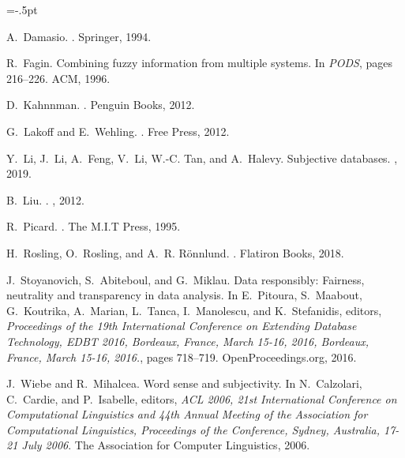 \documentclass[11pt]{article}
\begin{document}
\vspace{-.1cm}

\begin{thebibliography}{10}
\begin{small}



\itemsep=-.5pt

A.~Damasio.
.
\newblock Springer, 1994.

R.~Fagin.
\newblock Combining fuzzy information from multiple systems.
\newblock In {\em PODS}, pages 216--226. ACM, 1996.

D.~Kahnnman.
.
\newblock Penguin Books, 2012.

G.~Lakoff and E.~Wehling.
.
\newblock Free Press, 2012.

Y.~Li, J.~Li, A.~Feng, V.~Li, W.-C. Tan, and A.~Halevy.
\newblock Subjective databases.
, 2019.

B.~Liu.
.
, 2012.

R.~Picard.
.
\newblock The M.I.T Press, 1995.

H.~Rosling, O.~Rosling, and A.~R. Rönnlund.
.
\newblock Flatiron Books, 2018.

J.~Stoyanovich, S.~Abiteboul, and G.~Miklau.
\newblock Data responsibly: Fairness, neutrality and transparency in data
  analysis.
\newblock In E.~Pitoura, S.~Maabout, G.~Koutrika, A.~Marian, L.~Tanca,
  I.~Manolescu, and K.~Stefanidis, editors, {\em Proceedings of the 19th
  International Conference on Extending Database Technology, {EDBT} 2016,
  Bordeaux, France, March 15-16, 2016, Bordeaux, France, March 15-16, 2016.},
  pages 718--719. OpenProceedings.org, 2016.

J.~Wiebe and R.~Mihalcea.
\newblock Word sense and subjectivity.
\newblock In N.~Calzolari, C.~Cardie, and P.~Isabelle, editors, {\em {ACL}
  2006, 21st International Conference on Computational Linguistics and 44th
  Annual Meeting of the Association for Computational Linguistics, Proceedings
  of the Conference, Sydney, Australia, 17-21 July 2006}. The Association for
  Computer Linguistics, 2006.


\end{small}
\end{thebibliography}
\end{document}
